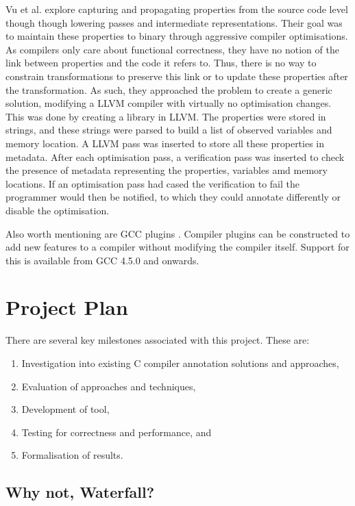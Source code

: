 \documentclass[twocolumn]{article}
\begin{document}
Vu et al. \cite{vu2020secure} explore capturing and propagating properties from the source code level though though lowering passes and intermediate representations. Their goal was to maintain these properties to binary through aggressive compiler optimisations. As compilers only care about functional correctness, they have no notion of the link between properties and the code it refers to. Thus, there is no way to constrain transformations to preserve this link or to update these properties after the transformation. As such, they approached the problem to create a generic solution, modifying a LLVM compiler with virtually no optimisation changes. This was done by creating a library in LLVM. The properties were stored in strings, and these strings were parsed to build a list of observed variables and memory location. A LLVM pass was inserted to store all these properties in metadata. After each optimisation pass, a verification pass was inserted to check the presence of metadata representing the properties, variables amd memory locations. If an optimisation pass had cased the verification to fail the programmer would then be notified, to which they could annotate differently or disable the optimisation.

Also worth mentioning are GCC plugins \cite{gccplugins}. Compiler plugins can be constructed to add new features to a compiler without modifying the compiler itself. Support for this is available from GCC 4.5.0 and onwards.

\clearpage
\onecolumn
\chapter{Project Plan}
There are several key milestones associated with this project. These are:
\begin{enumerate}
    \item Investigation into existing C compiler annotation solutions and approaches,
    \item Evaluation of approaches and techniques,
    \item Development of tool, 
    \item Testing for correctness and performance, and
    \item Formalisation of results.
\end{enumerate}

\section{Why not, Waterfall?}
\end{document}
